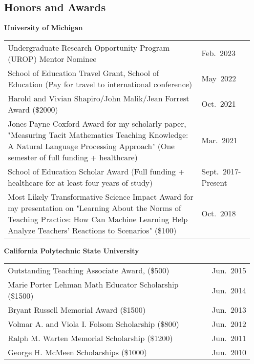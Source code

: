 \documentclass[margin,line]{res}
\begin{document}
\begin{resume}
\section{\sc Honors and Awards} 

{\bf University of Michigan}

\begin{tabular}{@{}p{4.0in}p{1.0in}}
Undergraduate Research Opportunity Program (UROP) Mentor Nominee & \multirow{1}{1in}{Feb.~2023}\\
School of Education Travel Grant, School of Education (Pay for travel to international conference) & \multirow{1}{1in}{May~2022}\\
Harold and Vivian Shapiro/John Malik/Jean Forrest Award (\$2000) & \multirow{1}{1in}{Oct.~2021}\\
Jones-Payne-Coxford Award for my scholarly paper, "Measuring Tacit Mathematics Teaching Knowledge: A Natural Language Processing Approach" (One semester of full funding + healthcare) & \multirow{1}{1in}{Mar.~2021}\\
School of Education Scholar Award (Full funding + healthcare for at least four years of study) & \multirow{1}{1in}{Sept.~2017-Present}\\
Most Likely Transformative Science Impact Award for my presentation on "Learning About the Norms of Teaching Practice: How Can Machine Learning Help Analyze Teachers' Reactions to Scenarios" (\$100) & \multirow{1}{1in}{Oct.~2018}\\
\end{tabular}
{\bf California Polytechnic State University}

\begin{tabular}{@{}p{4.0in}p{1.0in}}
Outstanding Teaching Associate Award, (\$500) & \multirow{1}{1in}{Jun.~2015}\\
Marie Porter Lehman Math Educator Scholarship (\$1500) & \multirow{1}{1in}{Jun.~2014}\\
Bryant Russell Memorial Award (\$1500) & \multirow{1}{1in}{Jun.~2013}\\
Volmar A. and Viola I. Folsom Scholarship (\$800) & \multirow{1}{1in}{Jun.~2012}\\
Ralph M. Warten Memorial Scholarship (\$1200) & \multirow{1}{1in}{Jun.~2011}\\
George H. McMeen Scholarships (\$1000) & \multirow{1}{1in}{Jun.~2010}\\

\end{tabular}



\end{resume}
\end{document}
